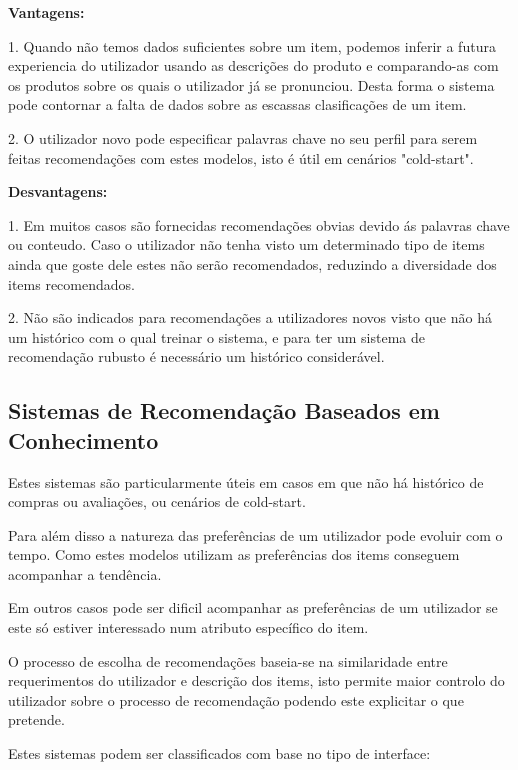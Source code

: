 \textbf{Vantagens:}\hfill
\hfill
\par 1. Quando não temos dados suficientes sobre um item, podemos inferir a futura experiencia do utilizador usando as descrições do produto e comparando-as com os produtos sobre os quais o utilizador já se pronunciou. Desta forma o sistema pode contornar a falta de dados sobre as escassas clasificações de um item.\newline
\hfill
\par 2. O utilizador novo pode especificar palavras chave no seu perfil para serem feitas recomendações com estes modelos, isto é útil em cenários "cold-start".\newline

\textbf{Desvantagens:}\hfill
\hfill
\par 1. Em muitos casos são fornecidas recomendações obvias devido ás palavras chave ou conteudo. Caso o utilizador não tenha visto um determinado tipo de items ainda que goste dele estes não serão recomendados, reduzindo a diversidade dos items recomendados.\newline
\hfill
\par 2. Não são indicados para recomendações a utilizadores novos visto que não há um histórico com o qual treinar o sistema, e para ter um sistema de recomendação rubusto é necessário um histórico considerável.\newline


\subsection{Sistemas de Recomendação Baseados em Conhecimento}
\hfill
\par Estes sistemas são particularmente úteis em casos em que não há histórico de compras ou avaliações, ou cenários de cold-start.
\par Para além disso a natureza das preferências de um utilizador pode evoluir com o tempo. Como estes modelos utilizam as preferências dos items conseguem acompanhar a tendência. 
\par Em outros casos pode ser dificil acompanhar as preferências de um utilizador se este só estiver interessado num atributo específico do item.
\par O processo de escolha de recomendações baseia-se na similaridade entre requerimentos do utilizador e descrição dos items, isto permite maior controlo do utilizador sobre o processo de recomendação podendo este explicitar o que pretende.
\par Estes sistemas podem ser classificados com base no tipo de interface:
\hfill
